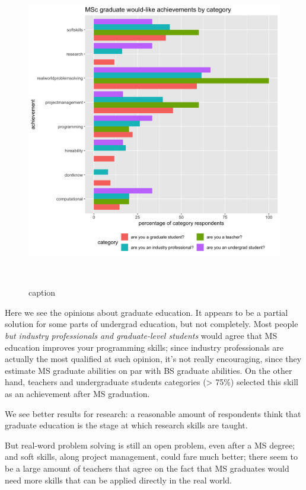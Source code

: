 \documentclass{sigchi}
\begin{document}
\begin{figure}
 \includegraphics[scale=0.2]{../data-analysis/plots_output/MSc_graduate_would-like_achievements_by_category.png}
  \caption{caption}~\label{fig:figure4}
\end{figure}

Here we see the opinions about graduate education. It appears to be a partial solution for some parts of undergrad education, but not completely. Most people \textit{but industry professionals and graduate-level students} would agree that MS education improves your programming skills; since industry professionals are actually the most qualified at such opinion, it's not really encouraging, since they estimate MS graduate abilities on par with BS graduate abilities. On the other hand, teachers and undergraduate students categories (> 75\%) selected this skill as an achievement after MS graduation.

We see better results for research: a reasonable amount of respondents think that graduate education is the  stage at which research skills are taught.

But real-word problem solving is still an open problem, even after a MS degree; and soft skills, along project management, could fare much better; there seem to be a large amount of teachers that agree on the fact that MS graduates would need more skills that can be applied directly in the real world.
\end{document}
